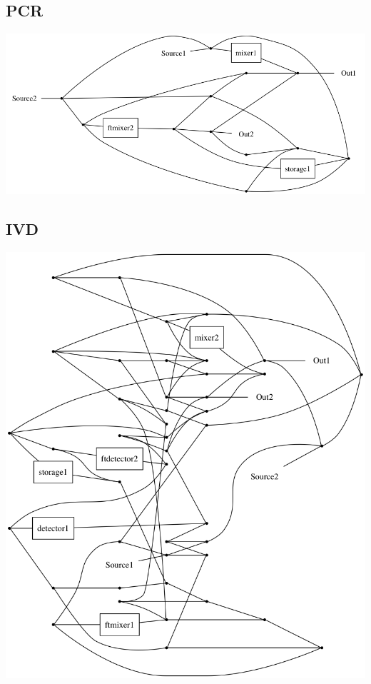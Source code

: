 \subsection{PCR}
\includegraphics[scale=0.35]{figures/ft-sa-archPCR1s-final.png}

\subsection{IVD}
\includegraphics[scale=0.35]{figures/ft-sa-archIVD1s-final.png}

\clearpage

